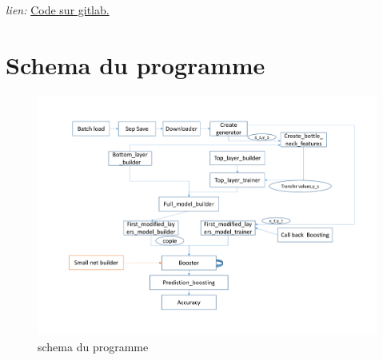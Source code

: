 \documentclass[11 pt]{article}
\begin{document}
\begin{appendices}
  \chapter{}
    \paragraph{}\emph{lien: }\href{https://gitlab.com/zlanderous/transboost}{Code sur gitlab.}
    \newpage


  \chapter{Schema du programme}
  \begin{figure}[h]
    \includegraphics[width=\textwidth]{figTot.pdf}
    \caption{schema du programme}
    \label{figTot}
  \end{figure}

\end{appendices}
\end{document}

